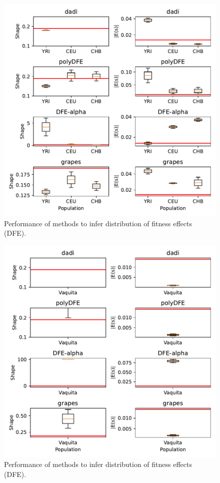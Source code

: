 \documentclass[hidelinks]{article}
\begin{document}
    \begin{figure}[ht]
        \centering
        \includegraphics[width=\textwidth]{figures/HomSap/dfe.inference.benchmark}
        \caption{
        \label{fig:dfe_humans}
        Performance of methods to infer distribution of fitness effects (DFE).
        }
    \end{figure}


    \begin{figure}[ht]
        \centering
        \includegraphics[width=\textwidth]{figures/PhoSin/dfe.inference.benchmark}
        \caption{
        \label{fig:dfe_vaquita}
        Performance of methods to infer distribution of fitness effects (DFE).
        }
    \end{figure}
\end{document}
